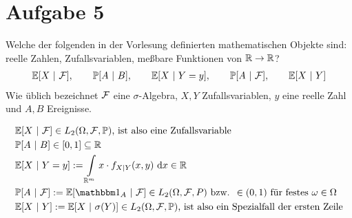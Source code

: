 \documentclass[12pt,a4paper]{article}
\begin{document}
\section*{Aufgabe 5}
Welche der folgenden in der Vorlesung definierten mathematischen
Objekte sind: reelle Zahlen, Zufallsvariablen, meßbare Funktionen von
$\mathbb{R}\to\mathbb{R}$?
\begin{align*}
\mathbb{E}[X~|~\mathcal{F}],\qquad\mathbb{P}[A~|~B],\qquad \mathbb{E}[X~|~Y=y],\qquad\mathbb{P}[A~|~\mathcal{F}],\qquad\mathbb{E}[X~|~Y]
\end{align*}
Wie üblich bezeichnet $\mathcal{F}$ eine $\sigma$-Algebra, $X,Y$  Zufallsvariablen, $y$ eine reelle Zahl und $A,B$ Ereignisse.
\begin{lösung}
\begin{align*}
&\E[X~|~\F]\in L_2(\Omega,\F,\P)\text{, ist also eine Zufallsvariable}\\
&\P[A~|~B]\in[0,1]\subseteq\R\\
&\E[X~|~Y=y]:=\int\limits_{\R^m}x\cdot f_{X|Y}(x,y)\d x\in\R\\
&\P[A~|~\F]:=\E[\indi_A~|~\F]\in L_2(\Omega,\F,P)\text{ bzw. }\in(0,1)\text{ für festes }\omega\in\Omega\\
&\E[X~|~Y]:=\E[X~|~\sigma(Y)]\in L_2(\Omega,\F,\P)\text{, ist also ein Spezialfall der ersten Zeile}
\end{align*}
\end{lösung}
\end{document}
